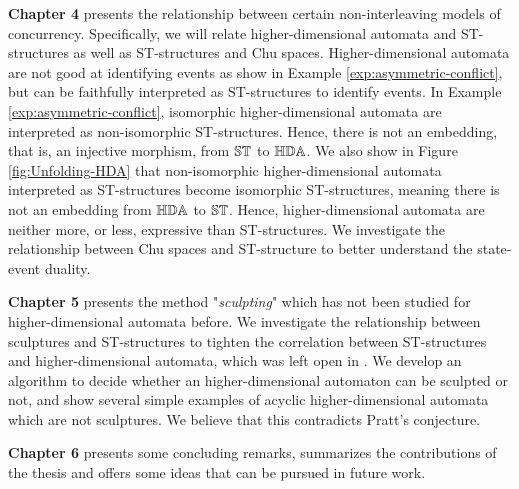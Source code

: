 \textbf{Chapter 4} presents the relationship between certain non-interleaving models of concurrency. Specifically, we will relate higher-dimensional automata and ST-structures as well as ST-structures and Chu spaces. Higher-dimensional automata are not good at identifying events as show in Example \ref{exp:asymmetric-conflict}, but can be faithfully interpreted as ST-structures to identify events. In Example \ref{exp:asymmetric-conflict}, isomorphic higher-dimensional automata are interpreted as non-isomorphic ST-structures. Hence, there is not an embedding, that is, an injective morphism, from $\mathbb{ST}$ to $\mathbb{HDA}$. We also show in Figure \ref{fig:Unfolding-HDA} that non-isomorphic higher-dimensional automata interpreted as ST-structures become isomorphic ST-structures, meaning there is not an embedding from $\mathbb{HDA}$ to $\mathbb{ST}$. Hence, higher-dimensional automata are neither more, or less, expressive than ST-structures. We investigate the relationship between Chu spaces and ST-structure to better understand the state-event duality.

\textbf{Chapter 5} presents the method "\emph{sculpting}" which has not been studied for higher-dimensional automata before. We investigate the relationship between sculptures and ST-structures to tighten the correlation between ST-structures and higher-dimensional automata, which was left open in \cite{Johansen16STstruct}. We develop an algorithm to decide whether an higher-dimensional automaton can be sculpted or not, and show several simple examples of acyclic higher-dimensional automata which are not sculptures. We believe that this contradicts Pratt's conjecture.

\textbf{Chapter 6} presents some concluding remarks, summarizes the contributions of the thesis and offers some ideas that can be pursued in future work.